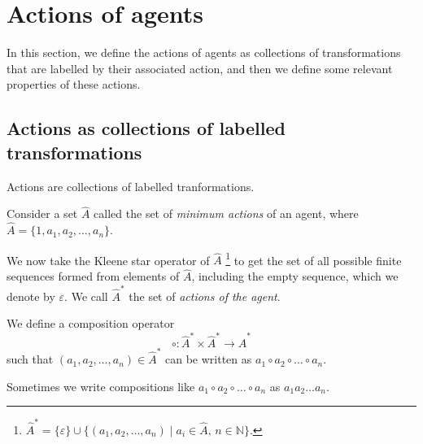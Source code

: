 \section{Actions of agents}

In this section, we define the actions of agents as collections of transformations that are labelled by their associated action, and then we define some relevant properties of these actions.

\subsection{Actions as collections of labelled transformations}



\begin{postulate}
	Actions are collections of labelled tranformations.
\end{postulate}

Consider a set $\hat{A}$ called the set of \emph{minimum actions} of an agent, where $\hat{A} = \{1, a_{1}, a_{2}, \dots, a_{n}\}$.

We now take the Kleene star operator of $\hat{A}$ \footnote{
	$\hat{A}^{\ast} = \{ \varepsilon \} \cup \{ (a_1, a_2, \dots, a_n) \mid a_i \in \hat{A}, \, n \in \mathbb{N} \}$.
} to get the set of all possible finite sequences formed from elements of $\hat{A}$, including the empty sequence, which we denote by $\varepsilon$.
We call $\hat{A}^{\ast}$ the set of \emph{actions of the agent}.

We define a composition operator
\begin{equation}
	\circ: \hat{A}^{\ast} \times \hat{A}^{\ast} \to \hat{A}^{\ast}
\end{equation}
such that $(a_1, a_2, \dots, a_n) \in \hat{A}^{\ast}$ can be written as $a_1 \circ a_2 \circ \dots \circ a_n$.

\begin{definition}
	Sometimes we write compositions like $a_1 \circ a_2 \circ \dots \circ a_n$ as $a_1 a_2 \dots a_n$.
\end{definition}

